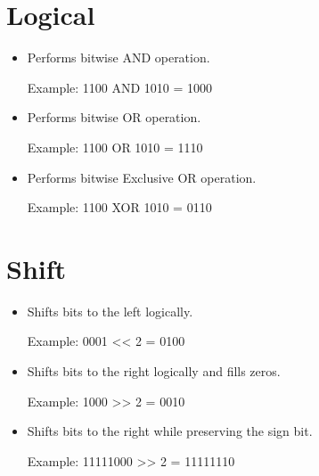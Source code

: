 \documentclass[letterpaper,10pt,english]{sphinxmanual}
\begin{document}
\section{Logical}
\label{\detokenize{alu_operations:logical}}\begin{itemize}
\item {} 
\sphinxAtStartPar
{} \sphinxhyphen{} Performs bitwise AND operation.

\sphinxAtStartPar
Example: 1100 AND 1010 = 1000

\item {} 
\sphinxAtStartPar
{} \sphinxhyphen{} Performs bitwise OR operation.

\sphinxAtStartPar
Example: 1100 OR 1010 = 1110

\item {} 
\sphinxAtStartPar
{} \sphinxhyphen{} Performs bitwise Exclusive OR operation.

\sphinxAtStartPar
Example: 1100 XOR 1010 = 0110

\end{itemize}


\section{Shift}
\label{\detokenize{alu_operations:shift}}\begin{itemize}
\item {} 
\sphinxAtStartPar
{} \sphinxhyphen{} Shifts bits to the left logically.

\sphinxAtStartPar
Example: 0001 << 2 = 0100

\item {} 
\sphinxAtStartPar
{} \sphinxhyphen{} Shifts bits to the right logically and fills zeros.

\sphinxAtStartPar
Example: 1000 >> 2 = 0010

\item {} 
\sphinxAtStartPar
{} \sphinxhyphen{} Shifts bits to the right while preserving the sign bit.

\sphinxAtStartPar
Example: 11111000 >> 2 = 11111110

\end{itemize}
\end{document}
